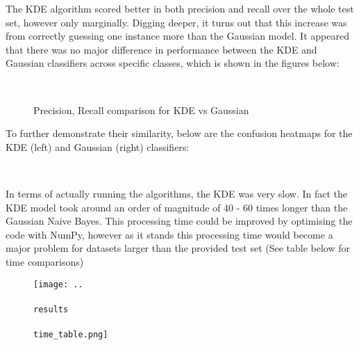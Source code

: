 \documentclass[11pt]{article}
\begin{document}
\noindent The KDE algorithm scored better in both precision and recall over the whole test set, however only marginally. 
Digging deeper, it turns out that this increase was from correctly guessing one instance more than the Gaussian model.
It appeared that there was no major difference in performance between the KDE and Gaussian classifiers across specific classes,
which is shown in the figures below:

\begin{figure}[!ht]
    \centering
    \caption{Precision, Recall comparison for KDE vs Gaussian}
    \quad
    \\
    \label{fig:sub1}
\end{figure}

\newpage
\noindent To further demonstrate their similarity, below are the confusion heatmaps for the KDE (left) and Gaussian (right) classifiers:
\begin{figure}[!ht]
    \centering
    \quad
    \\
    \label{fig:sub1}
\end{figure}

\noindent In terms of actually running the algorithms, the KDE was very slow. In fact the KDE model took around an order of magnitude of
40 - 60 times longer than the Gaussian Naive Bayes. This processing time could be improved by optimising the code with NumPy, however as
it stands this processing time would become a major problem for datasets larger than the provided test set (See table below for time comparisons)

\begin{figure}[h]
    \centerline{\texttt{[image: ..\\\\results\\\\time\_table.png]}}
\end{figure}
\end{document}
